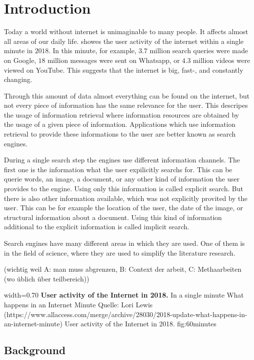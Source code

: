 \chapter{Introduction}
\label{cha:introduction}

Today a world without internet is unimaginable to many people. It affects almost all areas of our daily life.  showes the user activity of the internet within a single minute in $2018$. In this minute, for example, $3.7$ million search queries were made on Google, $18$ million messages were sent on Whatsapp, or $4.3$ million videos were viewed on YouTube. This suggests that the internet is big, fast-, and constantly changing.

Through this amount of data almost everything can be found on the internet, but not every piece of information has the same relevance for the user. This descripes the usage of information retrieval where information resources are obtained by the usage of a given piece of information. Applications which use information retrieval to provide these informations to the user are better known as search engines.

During a single search step the engines use different information channels. The first one is the information what the user expilicitly searchs for. This can be querie words, an image, a document, or any other kind of information the user provides to the engine. Using only this information is called explicit search. But there is also other information available, which was not explicitly provited by the user. This can be for example the location of the user, the date of the image, or structural information about a document. Using this kind of information additional to the explicit information is called implicit search.

Search engines have many different areas in which they are used. One of them is in the field of science, where they are used to simplify the literature research.


(wichtig weil A: man muss abgrenzen, B: Context der arbeit, C: Methaarbeiten (wo üblich über teilbereich))

      {width=0.70\textwidth}
      {\textbf{User activity of the Internet in 2018.} In a single minute What happens in an Internet Minute  Quelle: Lori Lewis (https://www.allaccess.com/merge/archive/28030/2018-update-what-happens-in-an-internet-minute)}
      {User activity of the Internet in 2018.}
      {fig:60minutes}

\section{Background}
\label{sec:background}

